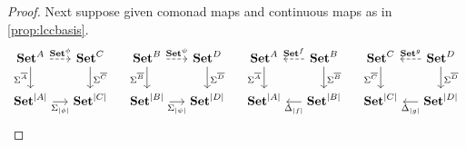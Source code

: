\documentclass[11pt, oneside, article]{memoir}
\theoremstyle{plain}
\theoremstyle{definition}
\theoremstyle{remark}
\DeclarePairedDelimiter{\abs}{\lvert}{\rvert}
\newcommand{\namedcat}[1]{\mathbf{#1}}
\newcommand{\Set}{\namedcat{Set}}
\newcommand{\CoalgOn}[2]{{#2}^{#1}}
\newcommand{\CoalgSet}[1]{\CoalgOn{#1}{\Set}}
\newcommand{\clift}[1]{\overline{#1}}
\newcommand{\pts}[1]{{\abs{#1}}}
\newcommand{\one}[1]{\pts{#1}}
\newcommand{\carr}{\Sigma}
\newcommand{\leindex}[1]{\Sigma_{#1}}
\newcommand{\reindex}[1]{\Delta_{#1}}
\newcommand{\car}[1]{\carr^{#1}}
\newcommand{\com}[2]{{#1}^{#2}}
\newcommand{\con}[2]{{#1}^{#2}}
\newcommand{\cmnd}[1]{{#1}}
\newcommand{\cA}{\cmnd{A}}
\newcommand{\cB}{\cmnd{B}}
\newcommand{\cC}{\cmnd{C}}
\newcommand{\cD}{\cmnd{D}}
\newcommand{\ASet}{\CoalgSet{\cA}}
\newcommand{\BSet}{\CoalgSet{\cB}}
\newcommand{\CSet}{\CoalgSet{\cC}}
\newcommand{\DSet}{\CoalgSet{\cD}}
\newcommand{\SetpA}{\Set^\pts{\cA}}
\newcommand{\SetpB}{\Set^\pts{\cB}}
\newcommand{\SetpC}{\Set^\pts{\cC}}
\newcommand{\SetpD}{\Set^\pts{\cD}}
\begin{document}
\begin{proof}
  Next suppose given comonad maps and continuous maps as in \cref{prop:lccbasis}.
  \[
    \begin{tikzcd}[column sep=12.5]
      \ASet & \CSet \\
      {\SetpA} & {\SetpC}
      \arrow["{\com{\Set}{\phi}}", dashed, from=1-1, to=1-2]
      \arrow["\car{\clift{\cA}}"', from=1-1, to=2-1]
      \arrow["\car{\clift{\cC}}", from=1-2, to=2-2]
      \arrow["{\leindex{\one{\phi}}}"', from=2-1, to=2-2]
    \end{tikzcd}
    \quad
    \begin{tikzcd}[column sep=12.5]
      \BSet & \DSet \\
      {\SetpB} & {\SetpD}
      \arrow["{\com{\Set}{\psi}}", dashed, from=1-1, to=1-2]
      \arrow["\car{\clift{\cB}}"', from=1-1, to=2-1]
      \arrow["\car{\clift{\cD}}", from=1-2, to=2-2]
      \arrow["{\leindex{\one{\psi}}}"', from=2-1, to=2-2]
    \end{tikzcd}
    \quad
    \begin{tikzcd}[column sep=12.5]
      \ASet & \BSet \\
      {\SetpA} & {\SetpB}
      \arrow["\car{\clift{\cA}}"', from=1-1, to=2-1]
      \arrow["{\con{\Set}{f}}"', dashed, from=1-2, to=1-1]
      \arrow["\car{\clift{\cB}}", from=1-2, to=2-2]
      \arrow["{\reindex{\one{f}}}", from=2-2, to=2-1]
    \end{tikzcd}
    \quad
    \begin{tikzcd}[column sep=12.5]
      \CSet & \DSet \\
      {\SetpC} & {\SetpD}
      \arrow["\car{\clift{\cC}}"', from=1-1, to=2-1]
      \arrow["{\con{\Set}{g}}"', dashed, from=1-2, to=1-1]
      \arrow["\car{\clift{\cD}}", from=1-2, to=2-2]
      \arrow["{\reindex{\one{g}}}", from=2-2, to=2-1]
    \end{tikzcd}
  \]


\end{proof}
\end{document}
